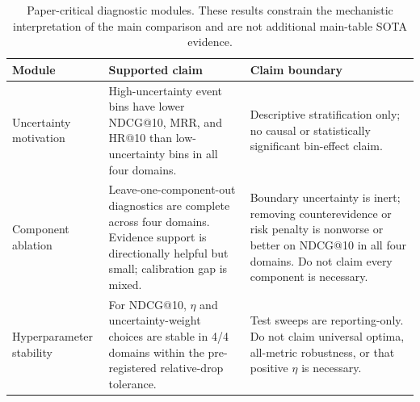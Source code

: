 \begin{table}[t]
\centering
\small
\caption{Paper-critical diagnostic modules. These results constrain the
mechanistic interpretation of the main comparison and are not additional
main-table SOTA evidence.}
\label{tab:module_evidence}
\begin{tabular}{p{}p{}p{}}
\toprule
Module & Supported claim & Claim boundary \\
\midrule
Uncertainty motivation
& High-uncertainty \method{} event bins have lower NDCG@10, MRR, and HR@10 than low-uncertainty bins in all four domains.
& Descriptive stratification only; no causal or statistically significant bin-effect claim. \\
\midrule
Component ablation
& Leave-one-component-out diagnostics are complete across four domains.
Evidence support is directionally helpful but small; calibration gap is mixed.
& Boundary uncertainty is inert; removing counterevidence or risk penalty is nonworse or better on NDCG@10 in all four domains. Do not claim every component is necessary. \\
\midrule
Hyperparameter stability
& For NDCG@10, $\eta$ and uncertainty-weight choices are stable in 4/4 domains within the pre-registered relative-drop tolerance.
& Test sweeps are reporting-only. Do not claim universal optima, all-metric robustness, or that positive $\eta$ is necessary. \\
\bottomrule
\end{tabular}
\end{table}
